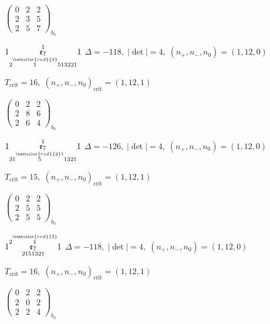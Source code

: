 \documentclass[10pt]{article}
\begin{document}
\hspace{2em}$\left(\begin{smallmatrix}0 & 2 & 2 \\ 2 & 3 & 5 \\ 2 & 5 & 7\end{smallmatrix}\right)_{\!b_0}$

\smallskip

$1\overset{1}{\underset{2\overset{\textcolor{red}{2}}{1}513221}{\mathfrak{e}_7}}1$ \quad $\Delta=-118,\; |\det|=4,\; (n_+,n_-,n_0)=(1,12,0)$

\hspace{1em}$T_{\text{crit}}=16,\; (n_+,n_-,n_0)_{\text{crit}}=(1,12,1)$

\hspace{2em}$\left(\begin{smallmatrix}0 & 2 & 2 \\ 2 & 8 & 6 \\ 2 & 6 & 4\end{smallmatrix}\right)_{\!b_0}$

\smallskip

$1\overset{1}{\underset{31\overset{\textcolor{red}{2}1}{5}1321}{\mathfrak{e}_7}}1$ \quad $\Delta=-126,\; |\det|=4,\; (n_+,n_-,n_0)=(1,12,0)$

\hspace{1em}$T_{\text{crit}}=15,\; (n_+,n_-,n_0)_{\text{crit}}=(1,12,1)$

\hspace{2em}$\left(\begin{smallmatrix}0 & 2 & 2 \\ 2 & 5 & 5 \\ 2 & 5 & 5\end{smallmatrix}\right)_{\!b_0}$

\smallskip

$1\overset{2\overset{\textcolor{red}{2}}{1}}{\underset{2151321}{\mathfrak{e}_7}}1$ \quad $\Delta=-118,\; |\det|=4,\; (n_+,n_-,n_0)=(1,12,0)$

\hspace{1em}$T_{\text{crit}}=16,\; (n_+,n_-,n_0)_{\text{crit}}=(1,12,1)$

\hspace{2em}$\left(\begin{smallmatrix}0 & 2 & 2 \\ 2 & 0 & 2 \\ 2 & 2 & 4\end{smallmatrix}\right)_{\!b_0}$
\end{document}
